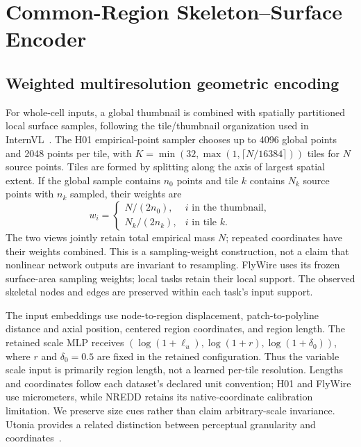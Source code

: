 \section{Common-Region Skeleton--Surface Encoder}
\label{sec:method}

\subsection{Weighted multiresolution geometric encoding}

For whole-cell inputs, a global thumbnail is combined with spatially partitioned local surface samples, following the tile/thumbnail organization used in InternVL~\cite{chen2024internvl}. The H01 empirical-point sampler chooses up to 4096 global points and 2048 points per tile, with $K=\min(32,\max(1,\lceil N/16384\rceil))$ tiles for $N$ source points. Tiles are formed by splitting along the axis of largest spatial extent. If the global sample contains $n_0$ points and tile $k$ contains $N_k$ source points with $n_k$ sampled, their weights are
\begin{equation}
 w_i=\begin{cases}N/(2n_0),& i\text{ in the thumbnail},\\
 N_k/(2n_k),& i\text{ in tile }k.
 \end{cases}
 \label{eq:sampling_weights}
\end{equation}
The two views jointly retain total empirical mass $N$; repeated coordinates have their weights combined. This is a sampling-weight construction, not a claim that nonlinear network outputs are invariant to resampling. FlyWire uses its frozen surface-area sampling weights; local tasks retain their local support. The observed skeletal nodes and edges are preserved within each task's input support.

The input embeddings use node-to-region displacement, patch-to-polyline distance and axial position, centered region coordinates, and region length. The retained scale MLP receives $(\log(1+\ell_u),\log(1+r),\log(1+\delta_0))$, where $r$ and $\delta_0=0.5$ are fixed in the retained configuration. Thus the variable scale input is primarily region length, not a learned per-tile resolution. Lengths and coordinates follow each dataset's declared unit convention; H01 and FlyWire use micrometers, while NREDD retains its native-coordinate calibration limitation. We preserve size cues rather than claim arbitrary-scale invariance. Utonia provides a related distinction between perceptual granularity and coordinates~\cite{utonia2026}.

